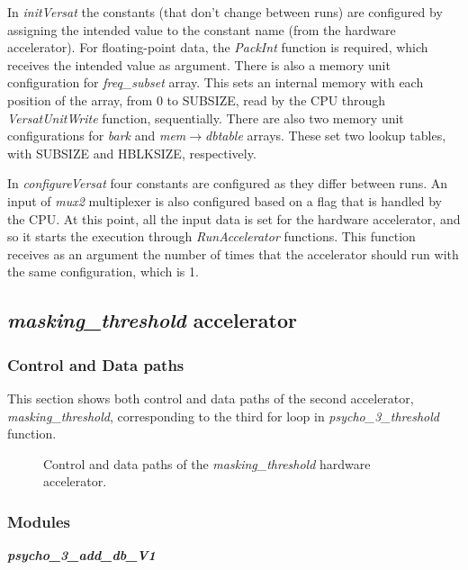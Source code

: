 In \textit{initVersat} the constants (that don't change between runs) are configured by assigning the intended value to the constant name (from the hardware accelerator). For floating-point data, the \textit{PackInt} function is required, which receives the intended value as argument.
There is also a memory unit configuration for \textit{freq\_subset} array. This sets an internal memory with each position of the array, from 0 to SUBSIZE, read by the CPU through \textit{VersatUnitWrite} function, sequentially.
There are also two memory unit configurations for \textit{bark} and \textit{mem}$\rightarrow$\textit{dbtable} arrays. These set two lookup tables, with SUBSIZE and HBLKSIZE, respectively.

In \textit{configureVersat} four constants are configured as they differ between runs. An input of \textit{mux2} multiplexer is also configured based on a flag that is handled by the CPU.
At this point, all the input data is set for the hardware accelerator, and so it starts the execution through \textit{RunAccelerator} functions. This function receives as an argument the number of times that the accelerator should run with the same configuration, which is 1.


\subsection{\textit{masking\_threshold} accelerator}

\subsubsection{Control and Data paths}
This section shows both control and data paths of the second accelerator, \textit{masking\_threshold}, corresponding to the third for loop in \textit{psycho\_3\_threshold} function.

\begin{figure}[H]
\centerline{}
\caption{Control and data paths of the \textit{masking\_threshold} hardware accelerator.}
\label{data2}
\end{figure}

\subsubsection{Modules}

\vspace{0.5cm}

\textbf{\textit{psycho\_3\_add\_db\_V1}}

